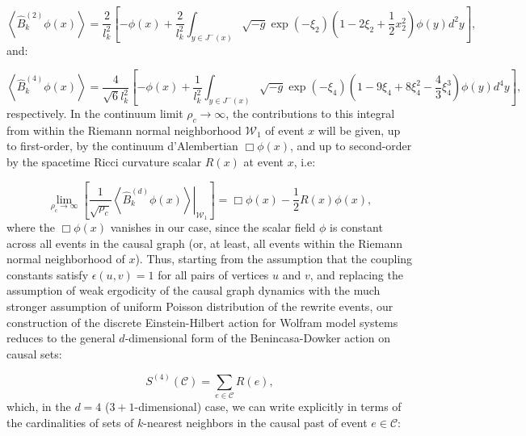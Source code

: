 \documentclass{article}
\begin{document}
\begin{equation}
\left\langle \hat{B}_{k}^{\left( 2 \right)} \phi \left( x \right) \right\rangle = \frac{2}{l_{k}^{2}} \left[ - \phi \left( x \right) + \frac{2}{l_{k}^{2}} \int_{y \in J^{-} \left( x \right)} \sqrt{-g} \exp \left( - \xi_2 \right) \left( 1 - 2 \xi_2 + \frac{1}{2} x_{2}^{2} \right) \phi \left( y \right) d^2 y \right],
\end{equation}
and:

\begin{equation}
\left\langle \hat{B}_{k}^{\left( 4 \right)} \phi \left( x \right) \right\rangle = \frac{4}{\sqrt{6} l_{k}^{2}} \left[ - \phi \left( x \right) + \frac{1}{l_{k}^{2}} \int_{y \in J^{-} \left( x \right)} \sqrt{-g} \exp \left( - \xi_4 \right) \left( 1 - 9 \xi_4 + 8 \xi_{4}^{2} - \frac{4}{3} \xi_{4}^{3} \right) \phi \left( y \right) d^4 y \right],
\end{equation}
respectively. In the continuum limit ${\rho_c \to \infty}$, the contributions to this integral from within the Riemann normal neighborhood ${\mathcal{W}_1}$ of event $x$ will be given, up to first-order, by the continuum d'Alembertian ${\Box \phi \left( x \right)}$, and up to second-order by the spacetime Ricci curvature scalar ${R \left( x \right)}$ at event $x$, i.e:

\begin{equation}
\lim_{\rho_c \to \infty} \left[ \frac{1}{\sqrt{\rho_c}} \left. \left\langle \hat{B}_{k}^{\left( d \right)} \phi \left( x \right) \right\rangle \right\rvert_{\mathcal{W}_1} \right] = \Box \phi \left( x \right) - \frac{1}{2} R \left( x \right) \phi \left( x \right),
\end{equation}
where the ${\Box \phi \left( x \right)}$ vanishes in our case, since the scalar field ${\phi}$ is constant across all events in the causal graph (or, at least, all events within the Riemann normal neighborhood of $x$). Thus, starting from the assumption that the coupling constants satisfy ${\epsilon \left( u, v \right) = 1}$ for all pairs of vertices $u$ and $v$, and replacing the assumption of weak ergodicity of the causal graph dynamics with the much stronger assumption of uniform Poisson distribution of the rewrite events, our construction of the discrete Einstein-Hilbert action for Wolfram model systems reduces to the general $d$-dimensional form of the Benincasa-Dowker action on causal sets:

\begin{equation}
S^{\left( 4 \right)} \left( \mathcal{C} \right) = \sum_{e \in \mathcal{C}} R \left( e \right),
\end{equation}
which, in the ${d = 4}$ (${3 + 1}$-dimensional) case, we can write explicitly in terms of the cardinalities of sets of $k$-nearest neighbors in the causal past of event ${e \in \mathcal{C}}$:
\end{document}
